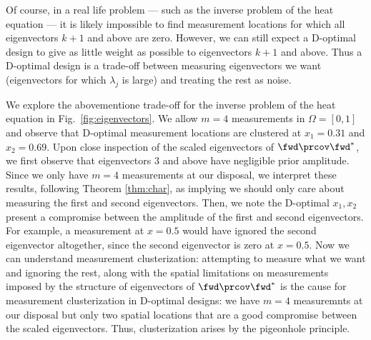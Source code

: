 Of course, in a real life problem --- such as the inverse problem of
the heat equation --- it is likely impossible to find measurement
locations for which all eigenvectors $k+1$ and above are
zero. However, we can still expect a D-optimal design to give as
little weight as possible to eigenvectors $k+1$ and above. Thus a
D-optimal design is a trade-off between measuring eigenvectors we want
(eigenvectors for which $\lambda_j$ is large) and treating the rest as
noise.


We explore the abovementione trade-off for the inverse problem of the
heat equation in Fig.~\ref{fig:eigenvectors}. We allow $m=4$
measurements in $\Omega = [0,1]$ and observe that D-optimal
measurement locations are clustered at $x_1 = 0.31$ and $x_2 =
0.69$. Upon close inspection of the scaled eigenvectors of $\fwd
\prcov \fwd^*$, we first observe that eigenvectors $3$ and above have
negligible prior amplitude. Since we only have $m=4$ measurements at
our disposal, we interpret these results, following Theorem
\ref{thm:char}, as implying we should only care about measuring the
first and second eigenvectors. Then, we note the D-optimal $x_1,x_2$
present a compromise between the amplitude of the first and second
eigenvectors. For example, a measurement at $x=0.5$ would have ignored
the second eigenvector altogether, since the second eigenvector is
zero at $x=0.5$.  Now we can understand measurement clusterization:
attempting to measure what we want and ignoring the rest, along with
the spatial limitations on measurements imposed by the structure of
eigenvectors of $\fwd \prcov \fwd^*$ is the cause for measurement
clusterization in D-optimal designs: we have $m=4$ measuremnts at our
disposal but only two spatial locations that are a good compromise
between the scaled eigenvectors. Thus, clusterization arises by the
pigeonhole principle.
